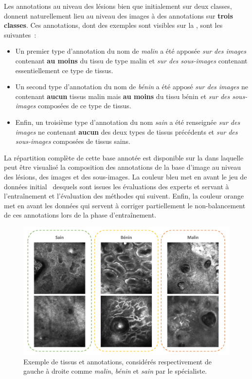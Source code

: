 Les annotations au niveau des lésions bien que initialement sur deux classes, donnent naturellement lieu au niveau des images à des annotations sur \textbf{trois classes}. Ces annotations, dont des exemples sont visibles sur la , sont les suivantes~:
\begin{itemize}
    \item Un premier type d'annotation du nom de \textit{malin} a été apposée \textit{sur des images} contenant \textbf{au moins} du tissu de type malin et \textit{sur des sous-images} contenant essentiellement ce type de tissus. 
    \item Un second type d'annotation du nom de \textit{bénin} a été apposé \textit{sur des images} ne contenant \textbf{aucun} tissus malin mais \textbf{au moins} du tissu bénin et \textit{sur des sous-images} composées de ce type de tissus. 
    \item  Enfin, un troisième type d'annotation du nom \textit{sain} a été renseignée \textit{sur des images} ne contenant \textbf{aucun} des deux types de tissus précédents et \textit{sur des sous-images} composées de tissus sains. 
\end{itemize}\par

La répartition complète de cette base annotée est disponible sur la  dans laquelle peut être visualisé la composition des annotations de la base d'image au niveau des lésions, des images et des sous-images. La couleur bleu met en avant le jeu de données initial~\cite{Cinotti2018} desquels sont issues les évaluations des experts et servant à l'entraînement et l'évaluation des méthodes qui suivent. Enfin, la couleur orange met en avant les données qui servent à corriger partiellement le non-balancement de ces annotations lors de la phase d'entraînement.\par

\begin{figure}[H]
    \begin{center}
        \includegraphics[width=0.9\linewidth]{contents/ii_preamble_microscopy/resources/example_rcm_data.pdf}
        \caption{Exemple de tissus et annotations, considérés respectivement de gauche à droite comme \textit{malin}, \textit{bénin} et \textit{sain} par le spécialiste.}
        \label{fig:example_rcm_data}
    \end{center} 
\end{figure}\par

